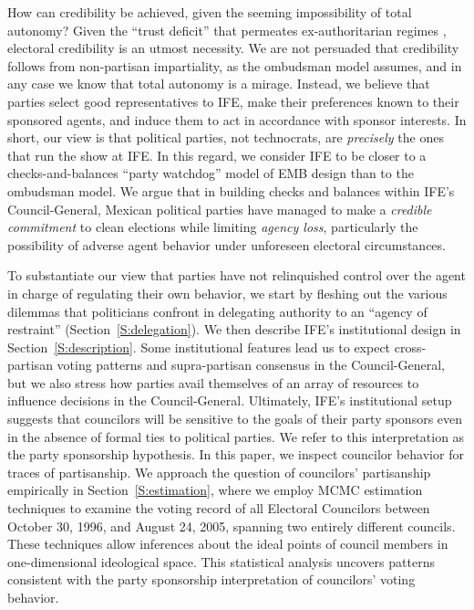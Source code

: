 \documentclass[12 pt]{article}
\begin{document}
How can credibility be achieved, given the seeming impossibility of total autonomy?  Given the ``trust deficit'' that permeates ex-authoritarian regimes \citep{Linz1996}, electoral credibility is an utmost necessity.  We are not persuaded that credibility follows from non-partisan impartiality, as the ombudsman model assumes, and in any case we know that total autonomy is a mirage.  Instead, we believe that parties select good representatives to IFE, make their preferences known to their sponsored agents, and induce them to act in accordance with sponsor interests.  In short, our view is that political parties, not technocrats, are \emph{precisely} the ones that run the show at IFE.  In this regard, we consider IFE to be closer to a checks-and-balances ``party watchdog'' model of EMB design than to the ombudsman model. We argue that in building checks and balances within IFE's Council-General, Mexican political parties have managed  to make a \emph{credible commitment} to clean elections while limiting \emph{agency loss}, particularly the possibility of adverse agent behavior under unforeseen electoral circumstances.

To substantiate our view that parties have not relinquished control over the agent in charge of regulating their own behavior, we start by fleshing out the various dilemmas that politicians confront in delegating authority to an ``agency of restraint'' (Section~\ref{S:delegation}).  We then describe IFE's institutional design in Section~\ref{S:description}.  Some institutional features lead us to expect cross-partisan voting patterns and supra-partisan consensus in the Council-General, but we also stress how parties avail themselves of an array of resources to influence decisions in the Council-General.  Ultimately, IFE's institutional setup suggests that councilors will be sensitive to the goals of their party sponsors even in the absence of formal ties to political parties.  We refer to this interpretation as the party sponsorship hypothesis.  In this paper, we inspect councilor behavior for traces of partisanship.  We approach the question of councilors' partisanship empirically in Section~\ref{S:estimation}, where we employ MCMC estimation techniques to examine the voting record of all Electoral Councilors between October 30, 1996, and August 24, 2005, spanning two entirely different councils.  These techniques allow inferences about the ideal points of council members in one-dimensional ideological space.  This statistical analysis uncovers patterns consistent with the party sponsorship interpretation of councilors' voting behavior.
\end{document}
